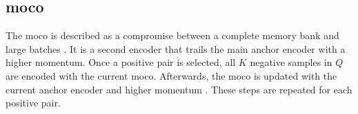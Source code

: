 \subsection{\acl{moco}}\label{subsec:MoCo}
The \ac{moco} is described as a compromise between a complete memory bank and large batches \citep{mochi_2020}.
It is a second encoder that trails the main anchor encoder with a higher momentum.
Once a positive pair is selected, all $K$ negative samples in $Q$ are encoded with the current \ac{moco}.
Afterwards, the \ac{moco} is updated with the current anchor encoder and higher momentum  \citep{mochi_2020,PCL_2021}. 
These steps are repeated for each positive pair.